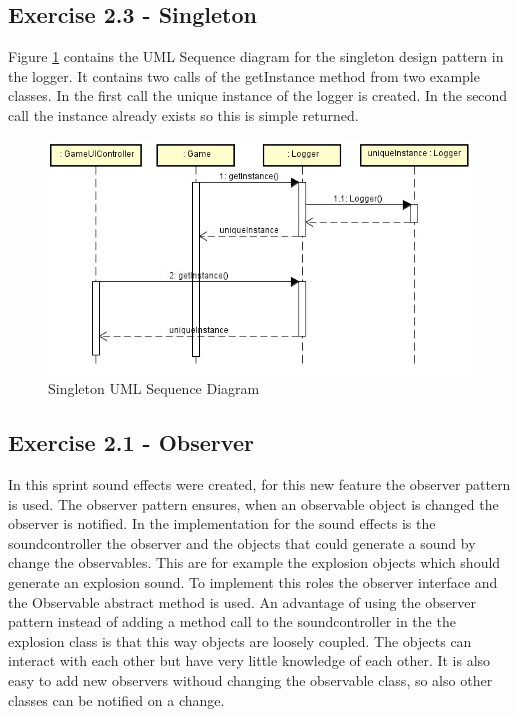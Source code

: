 \subsection{Exercise 2.3 - Singleton}
Figure \ref{fig:2-3singleton} contains the UML Sequence diagram for the singleton design pattern in the logger. It contains two calls of the getInstance method from two example classes. In the first call the unique instance of the logger is created. In the second call the instance already exists so this is simple returned. 

\begin{figure}[ht!]
\centering
\includegraphics[width=13cm]{loggerSequence.jpg}
\caption{Singleton UML Sequence Diagram}
\label{fig:2-3singleton}
\end{figure}

\subsection{Exercise 2.1 - Observer}
In this sprint sound effects were created, for this new feature the observer pattern is used. The observer pattern ensures, when an observable object is changed the observer is notified. In the implementation for the sound effects is the soundcontroller the observer and the objects that could generate a sound by change the observables. This are for example the explosion objects which should generate an explosion sound. To implement this roles the observer interface and the Observable abstract method is used. An advantage of using the observer pattern instead of adding a method call to the soundcontroller in the  the explosion class is that this way objects are loosely coupled. The objects can interact with each other but have very little knowledge of each other. It is also easy to add new observers withoud changing the observable class, so also other classes can be notified on a change. 

